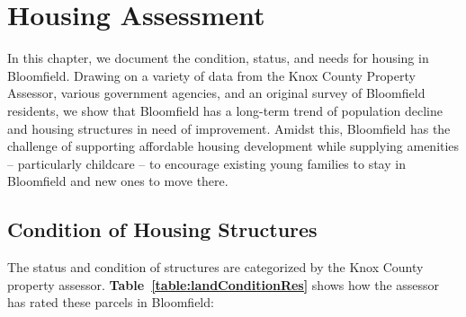 \section{Housing Assessment}

\noindent In this chapter, we document the condition, status, and needs for housing in Bloomfield. Drawing on a variety of data from the Knox County Property Assessor, various government agencies, and an original survey of Bloomfield residents, we show that Bloomfield has a long-term trend of population decline and housing structures in need of improvement. Amidst this, Bloomfield has the challenge of supporting affordable housing development while supplying amenities -- particularly childcare -- to encourage existing young families to stay in Bloomfield and new ones to move there.

\subsection{Condition of Housing Structures}

\noindent The status and condition of structures are categorized by the Knox County property assessor. \textbf{Table~\ref{table:landConditionRes}} shows how the assessor has rated these parcels in Bloomfield:



\pagebreak
